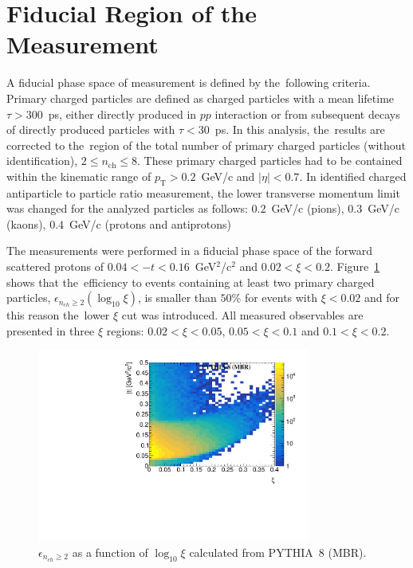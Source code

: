 \section{Fiducial Region of the Measurement}\label{section:star_fiducial}
A fiducial phase space of measurement  is defined by the~following criteria. Primary charged particles are defined as charged particles with a mean lifetime $\tau >300$~ps, either directly produced in $pp$ interaction or from subsequent decays of directly produced particles with $\tau <30$~ps. In this analysis, the~results are corrected to the~region of the total number of primary charged particles (without identification), $2\leq n_\textrm{ch} \leq 8$. These primary charged particles had to be contained within the kinematic range of $p_\textrm{T}>0.2$~GeV/c and $|\eta|<0.7$. In identified charged antiparticle to particle ratio measurement, the lower transverse momentum limit was changed for the analyzed particles as follows: $0.2$~GeV/c (pions), $0.3$~GeV/c (kaons), $0.4$~GeV/c (protons and antiprotons)

The measurements were performed in a fiducial phase space of the forward scattered protons of $0.04<-t<0.16$~GeV$^{2}$/c$^2$ and $0.02 < \xi<0.2$. Figure~\ref{fig:STARtrueMCfiducial} shows that the~efficiency  to events containing at least two primary charged particles, $\epsilon_{n_{ch}\geq 2}(\log_{10}\xi)$,  is smaller than $50\%$ for events with $\xi<0.02$ and for this reason the~lower $\xi$ cut was introduced. %
All measured observables are presented in three $\xi$ regions: $0.02<\xi<0.05$, $0.05<\xi<0.1$ and $0.1<\xi<0.2$.

\begin{figure}[h!]
	\centering
	\includegraphics[width=0.8\textwidth, page=17]{chapters/dataSampleSTAR/img/true.pdf}
	\caption{$\epsilon_{ n_{ch} \geq 2}$ as a function of $\log_{10}\xi$ calculated from PYTHIA~8 (MBR).}
	\label{fig:STARtrueMCfiducial}
\end{figure}

\FloatBarrier